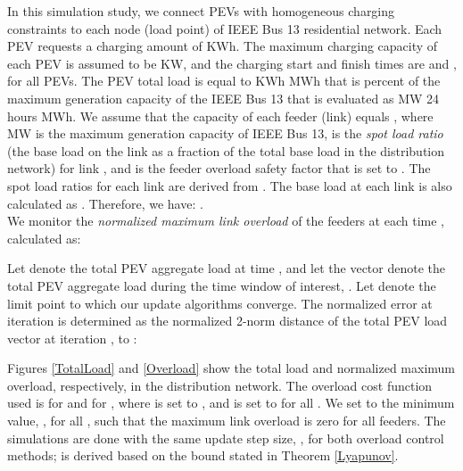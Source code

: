 \documentclass[12pt,draftcls,onecolumn]{IEEEtran}
\begin{document}
In this simulation study, we connect  PEVs with homogeneous charging constraints to each node (load point) of IEEE Bus 13 residential network. Each PEV requests a charging amount of  KWh.  The maximum charging capacity of each PEV is assumed to be  KW, and the charging start and finish times are  and , for all PEVs. The PEV total load is equal to  KWh  MWh that is  percent of the maximum generation capacity of the IEEE Bus 13 that is evaluated as  MW  24 hours  MWh. We assume that the capacity of each feeder (link)  equals , where  MW is the maximum generation capacity of IEEE Bus 13,  is the \textit{spot load ratio} (the base load on the link as a fraction of the total base load in the distribution network) for link , and  is the feeder overload safety factor that is set to . The spot load ratios for each link are derived from \cite{B13}. The base load at each link  is also calculated as . Therefore, we have: .\\
We monitor the \textit{normalized maximum link overload} of the feeders at each time , calculated as:

Let  denote the total PEV aggregate load at time , and let the vector  denote the total PEV aggregate load during the time window of interest, . Let  denote the limit point to which our update algorithms converge. The normalized error at iteration  is determined as the normalized 2-norm distance of the total PEV load vector at iteration , to :

Figures \ref{TotalLoad} and \ref{Overload} show the total load and normalized maximum overload, respectively, in the distribution network. The overload cost function used is  for  and  for , where  is set to , and  is set to  for all . We set  to the minimum value, , for all , such that the maximum link overload is zero for all feeders. The simulations are done with the same update step size, , for both overload control methods;  is derived based on the bound stated in Theorem \ref{Lyapunov}. 
\end{document}
